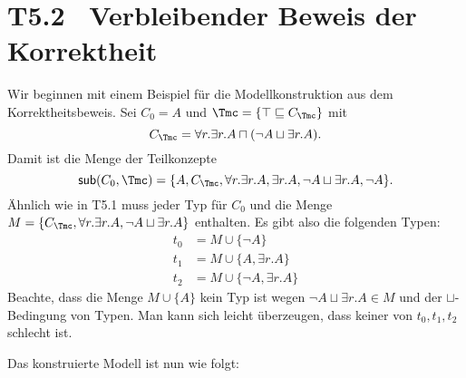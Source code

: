 \documentclass[fontsize=11pt, twoside=false, numbers=autoenddot]{scrbook}
\begin{document}
\pagebreak
\section*{T5.2~ Verbleibender Beweis der Korrektheit}

Wir beginnen mit einem Beispiel für die Modellkonstruktion aus dem
Korrektheitsbeweis. Sei $C_0=A$ und $\Tmc=\{\top\sqsubseteq C_\Tmc\}$
mit 
%
\[C_\Tmc = \forall r.\exists r.A\sqcap (\neg A\sqcup \exists r.A).\]
%
Damit ist die Menge der Teilkonzepte 
%
\[\textsf{sub}(C_0,\Tmc)=\{A,C_\Tmc,\forall r.\exists r.A,\exists
r.A,\neg A\sqcup\exists r.A,\neg A\}.\]
%
Ähnlich wie in T5.1 muss jeder Typ für $C_0$ und \Tmc die Menge
$M=\{C_\Tmc,\forall r.\exists r.A,\neg A\sqcup \exists r.A\}$
enthalten. Es gibt also die folgenden Typen: 
%
\begin{align*}
  t_0 & = M\cup \{\neg A\} \\
  t_1 & = M\cup \{A,\exists r.A\} \\
  t_2 & = M\cup \{\neg A,\exists r.A\} 
\end{align*}
%
Beachte, dass die Menge $M\cup\{A\}$ kein Typ ist wegen $\neg
A\sqcup \exists r.A\in M$ und der $\sqcup$-Bedingung von Typen. Man
kann sich leicht überzeugen, dass keiner von $t_0,t_1,t_2$ schlecht
ist.

Das konstruierte Modell ist nun wie folgt: 
%
\begin{center}
\end{center}
%
\end{document}
